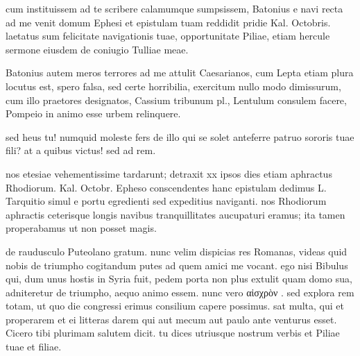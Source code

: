 


 cum instituissem ad te scribere calamumque sumpsissem, Batonius e navi recta ad me venit domum Ephesi et epistulam tuam reddidit pridie Kal. Octobris. laetatus sum felicitate navigationis tuae, opportunitate Piliae, etiam hercule sermone eiusdem de coniugio Tulliae meae.

 Batonius autem meros terrores ad me attulit Caesarianos, cum Lepta etiam plura locutus est, spero falsa, sed certe horribilia, exercitum nullo modo dimissurum, cum illo praetores designatos, Cassium tribunum pl., Lentulum consulem facere, Pompeio in animo esse urbem relinquere.

 sed heus tu! numquid moleste fers de illo qui se solet anteferre patruo sororis tuae fili? at a quibus victus! sed ad rem.

 nos etesiae vehementissime tardarunt; detraxit xx ipsos dies etiam aphractus Rhodiorum. Kal. Octobr. Epheso conscendentes hanc epistulam dedimus L. Tarquitio simul e portu egredienti sed expeditius naviganti. nos Rhodiorum aphractis ceterisque longis navibus tranquillitates aucupaturi eramus; ita tamen properabamus ut non posset magis.

 de raudusculo Puteolano gratum. nunc velim dispicias res Romanas, videas quid nobis de triumpho cogitandum putes ad quem amici me vocant. ego nisi Bibulus qui, dum unus hostis in Syria fuit, pedem porta non plus extulit quam domo sua, adniteretur de triumpho, aequo animo essem. nunc vero αἰσχρὸν . sed explora rem totam, ut quo die congressi erimus consilium capere possimus. sat multa, qui et properarem et ei litteras darem qui aut mecum aut paulo ante venturus esset. Cicero tibi plurimam salutem dicit. tu dices utriusque nostrum verbis et Piliae tuae et filiae.
